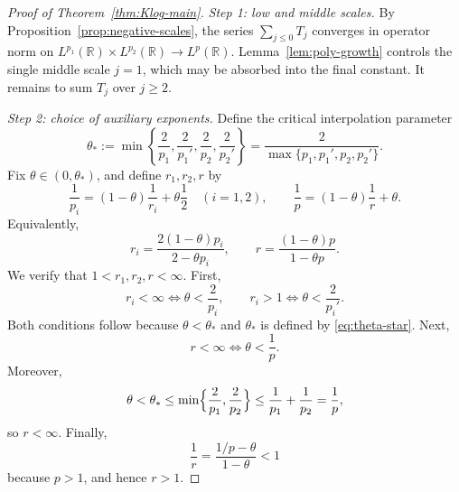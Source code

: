 \documentclass[11pt]{amsart}
\theoremstyle{remark}
\numberwithin{equation}{section}
\newcommand{\R}{\mathbb R}
\begin{document}
	\begin{proof}[Proof of Theorem~\ref{thm:Klog-main}]
		\emph{Step 1: low and middle scales.}
		By Proposition~\ref{prop:negative-scales}, the series \(\sum_{j\le0}T_j\)
		converges in operator norm on
		\(L^{p_1}(\R)\times L^{p_2}(\R)\to L^p(\R)\). Lemma~\ref{lem:poly-growth}
		controls the single middle scale \(j=1\), which may be absorbed into the final
		constant. It remains to sum \(T_j\) over \(j\ge2\).
		
		\smallskip
		\noindent\emph{Step 2: choice of auxiliary exponents.}
		Define the critical interpolation parameter
		\begin{equation}\label{eq:theta-star}
			\theta_* := \min\left\{ \frac{2}{p_1}, \frac{2}{p_1'}, \frac{2}{p_2}, \frac{2}{p_2'} \right\} = \frac{2}{\max\{p_1, p_1', p_2, p_2'\}}.
		\end{equation}
		Fix \(\theta\in(0,\theta_*)\), and define \(r_1,r_2,r\) by
		\begin{equation}\label{eq:aux-exponents}
			\frac1{p_i}=(1-\theta)\frac1{r_i}+\theta\frac12
			\quad (i=1,2),
			\qquad
			\frac1p=(1-\theta)\frac1r+\theta.
		\end{equation}
		Equivalently,
		\begin{equation}\label{eq:aux-explicit}
			r_i=\frac{2(1-\theta)p_i}{2-\theta p_i},
			\qquad
			r=\frac{(1-\theta)p}{1-\theta p}.
		\end{equation}
		We verify that \(1<r_1,r_2,r<\infty\). First,
		\[
		r_i<\infty \iff \theta<\frac2{p_i},
		\qquad
		r_i>1 \iff \theta<\frac2{p_i'}.
		\]
		Both conditions follow because \(\theta<\theta_*\) and \(\theta_*\) is defined
		by \eqref{eq:theta-star}.
		Next,
		\[
		r<\infty
		\iff
		\theta<\frac1p.
		\]
		Moreover,
		\[
		\theta<\theta_*
		\le
		\min\Bigl\{\frac2{p_1},\frac2{p_2}\Bigr\}
		\le
		\frac1{p_1}+\frac1{p_2}
		=
		\frac1p,
		\]
		so \(r<\infty\). Finally,
		\[
		\frac1r=\frac{1/p-\theta}{1-\theta}<1
		\]
		because \(p>1\), and hence \(r>1\).
		

\end{proof}
\end{document}
